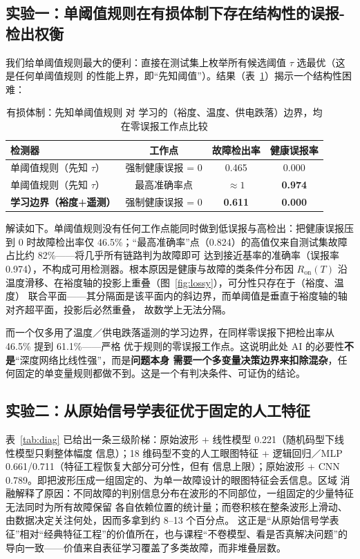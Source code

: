 \documentclass[11pt,a4paper,fontset=mac]{ctexart}
\begin{document}
\subsection{实验一：单阈值规则在有损体制下存在结构性的误报-检出权衡}
我们给单阈值规则最大的便利：直接在测试集上枚举所有候选阈值 $\tau$ 选最优（这是任何单阈值规则
的性能上界，即“先知阈值”）。结果（表~\ref{tab:rule}）揭示一个结构性困难：

\begin{table}[h]\centering\small
\caption{有损体制：先知单阈值规则 对 学习的（裕度、温度、供电跌落）边界，均在零误报工作点比较}\label{tab:rule}
\begin{tabular}{@{}lccc@{}}
\toprule
检测器 & 工作点 & 故障检出率 & 健康误报率 \\
\midrule
单阈值规则（先知 $\tau$） & 强制健康误报 = 0 & 0.465 & 0.000 \\
单阈值规则（先知 $\tau$） & 最高准确率点 & $\approx1$ & \textbf{0.974} \\
\textbf{学习边界（裕度+遥测）} & 强制健康误报 = 0 & \textbf{0.611} & \textbf{0.000} \\
\bottomrule
\end{tabular}
\end{table}

解读如下。单阈值规则没有任何工作点能同时做到低误报与高检出：把健康误报压到 0 时故障检出率仅
46.5\%；“最高准确率”点（0.824）的高值仅来自测试集故障占比约 82\%——将几乎所有链路判为故障即可
达到接近基率的准确率（误报率 0.974），不构成可用检测器。根本原因是健康与故障的类条件分布因
$R_\text{on}(T)$ 沿温度滑移、在裕度轴的投影上重叠（图~\ref{fig:lossy}），可分性只存在于（裕度、温度）
联合平面——其分隔面是该平面内的斜边界，而单阈值是垂直于裕度轴的轴对齐超平面，投影后必然重叠，
故数学上无法分隔。

而一个仅多用了温度／供电跌落遥测的学习边界，在同样零误报下把检出率从 46.5\% 提到 61.1\%——严格
优于规则的零误报工作点。这说明此处 AI 的必要性\textbf{不是}“深度网络比线性强”，而是\textbf{问题本身
需要一个多变量决策边界来扣除混杂}，任何固定的单变量规则都做不到。这是一个有判决条件、可证伪的结论。

\subsection{实验二：从原始信号学表征优于固定的人工特征}
表~\ref{tab:diag} 已给出一条三级阶梯：原始波形 + 线性模型 0.221（随机码型下线性模型只剩整体幅度
信息）；18 维码型不变的人工眼图特征 + 逻辑回归／MLP 0.661/0.711（特征工程恢复大部分可分性，但有
信息上限）；原始波形 + CNN 0.789。即把波形压成一组固定的、为单一故障设计的眼图特征会丢信息。区域
消融解释了原因：不同故障的判别信息分布在波形的不同部位，一组固定的少量特征无法同时为所有故障保留
各自依赖位置的统计量；而卷积核在整条波形上滑动、由数据决定关注何处，因而多拿到约 8--13 个百分点。
这正是“从原始信号学表征”相对“经典特征工程”的价值所在，也与课程“不卷模型、看是否真解决问题”的
导向一致——价值来自表征学习覆盖了多类故障，而非堆叠层数。
\end{document}
